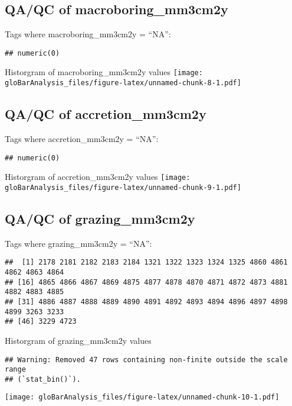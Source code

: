 \documentclass[
]{article}
\begin{document}
\hypertarget{qaqc-of-macroboring_mm3cm2y}{%
\subsection{QA/QC of
macroboring\_mm3cm2y}\label{qaqc-of-macroboring_mm3cm2y}}

Tags where macroboring\_mm3cm2y = ``NA'':

\begin{verbatim}
## numeric(0)
\end{verbatim}

Historgram of macroboring\_mm3cm2y values
\texttt{[image: gloBarAnalysis\_files/figure-latex/unnamed-chunk-8-1.pdf]}

\hypertarget{qaqc-of-accretion_mm3cm2y}{%
\subsection{QA/QC of
accretion\_mm3cm2y}\label{qaqc-of-accretion_mm3cm2y}}

Tags where accretion\_mm3cm2y = ``NA'':

\begin{verbatim}
## numeric(0)
\end{verbatim}

Historgram of accretion\_mm3cm2y values
\texttt{[image: gloBarAnalysis\_files/figure-latex/unnamed-chunk-9-1.pdf]}

\hypertarget{qaqc-of-grazing_mm3cm2y}{%
\subsection{QA/QC of grazing\_mm3cm2y}\label{qaqc-of-grazing_mm3cm2y}}

Tags where grazing\_mm3cm2y = ``NA'':

\begin{verbatim}
##  [1] 2178 2181 2182 2183 2184 1321 1322 1323 1324 1325 4860 4861 4862 4863 4864
## [16] 4865 4866 4867 4869 4875 4877 4878 4870 4871 4872 4873 4881 4882 4883 4885
## [31] 4886 4887 4888 4889 4890 4891 4892 4893 4894 4896 4897 4898 4899 3263 3233
## [46] 3229 4723
\end{verbatim}

Historgram of grazing\_mm3cm2y values

\begin{verbatim}
## Warning: Removed 47 rows containing non-finite outside the scale range
## (`stat_bin()`).
\end{verbatim}

\texttt{[image: gloBarAnalysis\_files/figure-latex/unnamed-chunk-10-1.pdf]}
\end{document}
